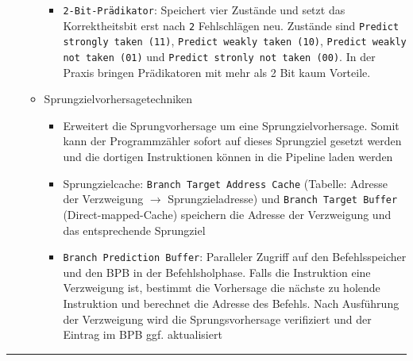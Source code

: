 \begin{itemize}
\begin{itemize}
\begin{itemize}
			\item \texttt{2-Bit-Prädikator}: Speichert vier Zustände und setzt das Korrektheitsbit erst nach \texttt{2} Fehlschlägen neu. Zustände sind \texttt{Predict strongly taken (11)}, \texttt{Predict weakly taken (10)}, \texttt{Predict weakly not taken (01)} und \texttt{Predict stronly not taken (00)}. In der Praxis bringen Prädikatoren mit mehr als 2 Bit kaum Vorteile.
		\end{itemize}
		\item Sprungzielvorhersagetechniken
		\begin{itemize}
			\item Erweitert die Sprungvorhersage um eine Sprungzielvorhersage. Somit kann der Programmzähler sofort auf dieses Sprungziel gesetzt werden und die dortigen Instruktionen können in die Pipeline laden werden
			\item Sprungzielcache: \texttt{Branch Target Address Cache} (Tabelle: Adresse der Verzweigung \(\rightarrow\) Sprungzieladresse) und \texttt{Branch Target Buffer} (Direct-mapped-Cache) speichern die Adresse der Verzweigung und das entsprechende Sprungziel
			\item \texttt{Branch Prediction Buffer}: Paralleler Zugriff auf den Befehlsspeicher und den BPB in der Befehlsholphase. Falls die Instruktion eine Verzweigung ist, bestimmt die Vorhersage die nächste zu holende Instruktion und berechnet die Adresse des Befehls. Nach Ausführung der Verzweigung wird die Sprungsvorhersage verifiziert und der Eintrag im BPB ggf. aktualisiert
		\end{itemize}
	\end{itemize}
\end{itemize}
\par\noindent\rule{\textwidth}{0.4pt}

